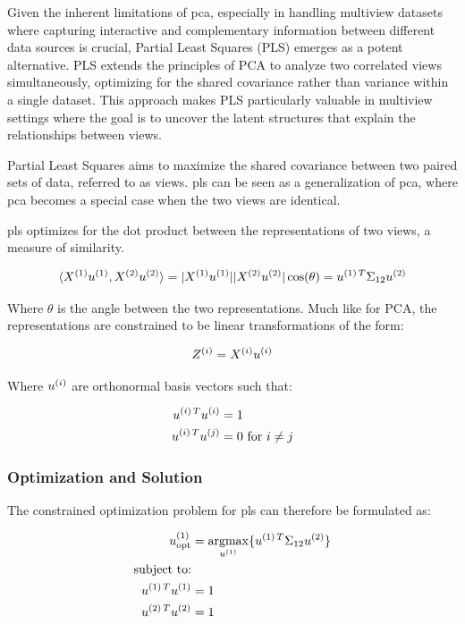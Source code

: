 Given the inherent limitations of \acrshort{pca}, especially in handling multiview datasets where capturing interactive and complementary information between different data sources is crucial, Partial Least Squares (PLS) emerges as a potent alternative. PLS extends the principles of PCA to analyze two correlated \gls{views} simultaneously, optimizing for the shared covariance rather than variance within a single dataset. This approach makes PLS particularly valuable in multiview settings where the goal is to uncover the latent structures that explain the relationships between views.

Partial Least Squares \citep{wold1975path} aims to maximize the shared covariance between two paired sets of data, referred to as \gls{views}. \acrshort{pls} can be seen as a generalization of \acrshort{pca}, where \acrshort{pca} becomes a special case when the two \gls{views} are identical.

\acrshort{pls} optimizes for the dot product between the \gls{representations} of two views, a measure of similarity.

\begin{align}
    \label{eq:dot-product}
    \langle X^{(1)}u^{(1)}, X^{(2)}u^{(2)}\rangle = |X^{(1)}u^{(1)}| |X^{(2)}u^{(2)}| \cos(\theta) = u^{(1)\,T} \Sigma_{12} u^{(2)}
\end{align}

Where $\theta$ is the angle between the two representations.
Much like for PCA, the \gls{representations} are constrained to be linear transformations of the form:

\begin{align}
    Z^{(i)} = X^{(i)} u^{(i)}
\end{align}

Where $u^{(i)}$ are orthonormal basis vectors such that:

\begin{align}
    u^{(i)\,T}u^{(i)} & = 1 \\
    u^{(i)\,T}u^{(j)} & = 0 \text{ for } i \neq j
\end{align}

\subsubsection{Optimization and Solution}

The constrained optimization problem for \acrshort{pls} can therefore be formulated as:

\begin{align}
    u^{(1)}_{\text{opt}} & = \underset{u^{(1)}}{\mathrm{argmax}} \{ u^{(1)\,T} \Sigma_{12} u^{(2)} \} \\
    \text{subject to:} \notag                                                                             \\
    u^{(1)\,T}u^{(1)}   & = 1 \notag                                                                    \\
    u^{(2)\,T}u^{(2)}   & = 1 \notag
\end{align}

